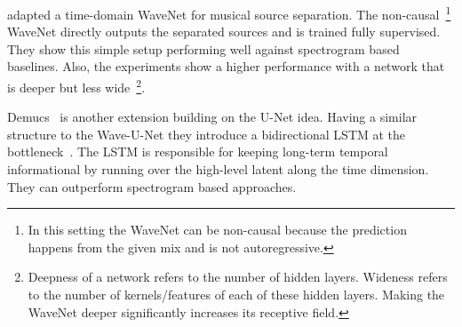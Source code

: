 \textcite{lluisEndtoend2019} adapted a time-domain WaveNet for musical source separation. The non-causal~\footnote{In this setting the WaveNet can be non-causal because the prediction happens from the given mix and is not autoregressive.} WaveNet directly outputs the separated sources and is trained fully supervised. They show this simple setup performing well against spectrogram based baselines. Also, the experiments show a higher performance with a network that is deeper but less wide~\footnote{Deepness of a network refers to the number of hidden layers. Wideness refers to the number of kernels/features of each of these hidden layers. Making the WaveNet deeper significantly increases its receptive field.}.

Demucs~\cite{defossezDemucs2019} is another extension building on the U-Net idea. Having a similar structure to the Wave-U-Net they introduce a bidirectional LSTM at the bottleneck~\cite{defossezSING2018}. The LSTM is responsible for keeping long-term temporal informational by running over the high-level latent along the time dimension. They can outperform spectrogram based approaches.

